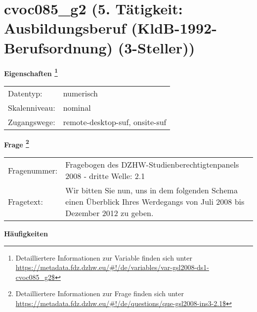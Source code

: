 
    \setcounter{footnote}{0}

    \vspace*{-1.8cm}
	\section{cvoc085\_g2 (5. Tätigkeit: Ausbildungsberuf (KldB-1992-Berufsordnung) (3-Steller))}
	\label{section:cvoc085_g2}



    \vspace*{0.5cm}
    \noindent\textbf{Eigenschaften
	\footnote{Detailliertere Informationen zur Variable finden sich unter
		\url{https://metadata.fdz.dzhw.eu/\#!/de/variables/var-gsl2008-ds1-cvoc085_g2$}}}\\
	\begin{tabularx}{\hsize}{@{}lX}
	Datentyp: & numerisch \\
	Skalenniveau: & nominal \\
	Zugangswege: &
	  remote-desktop-suf, 
	  onsite-suf
 \\
    \end{tabularx}



				\vspace*{0.5cm}
                \noindent\textbf{Frage
	                \footnote{Detailliertere Informationen zur Frage finden sich unter
		              \url{https://metadata.fdz.dzhw.eu/\#!/de/questions/que-gsl2008-ins3-2.1$}}}\\
				\begin{tabularx}{\hsize}{@{}lX}
					Fragenummer: &
					  Fragebogen des DZHW-Studienberechtigtenpanels 2008 - dritte Welle:
					  2.1
 \\
					Fragetext: & Wir bitten Sie nun, uns in dem folgenden Schema einen Überblick Ihres Werdegangs von Juli 2008 bis Dezember 2012 zu geben. \\
				\end{tabularx}





        		\vspace*{0.5cm}
                \noindent\textbf{Häufigkeiten}

